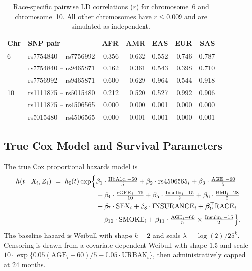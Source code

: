 \begin{table}[ht]
\centering
\caption{Race-specific pairwise LD correlations ($r$) for chromosome~6 and chromosome~10. All other chromosomes have $r \leq 0.009$ and are simulated as independent.}
\label{tab:app_snp_ld}
\small
\begin{tabular}{llrrrrr}
\hline
\textbf{Chr} & \textbf{SNP pair} & \textbf{AFR} & \textbf{AMR} &
\textbf{EAS} & \textbf{EUR} & \textbf{SAS} \\
\hline
6 & rs7754840 -- rs7756992 & 0.356 & 0.632 & 0.552 & 0.746 & 0.787 \\
  & rs7754840 -- rs9465871 & 0.162 & 0.361 & 0.543 & 0.398 & 0.710 \\
  & rs7756992 -- rs9465871 & 0.600 & 0.629 & 0.964 & 0.544 & 0.918 \\
\hline
10 & rs1111875 -- rs5015480 & 0.212 & 0.520 & 0.527 & 0.992 & 0.906 \\
   & rs1111875 -- rs4506565 & 0.000 & 0.000 & 0.001 & 0.000 & 0.000 \\
   & rs5015480 -- rs4506565 & 0.000 & 0.001 & 0.001 & 0.000 & 0.001 \\
\hline
\end{tabular}
\end{table}

\subsection{True Cox Model and Survival Parameters}
\label{app:sim2_cox}

The true Cox proportional hazards model is
\begin{align}
    h(t \mid X_i, Z_i) \;=\; h_0(t) \exp\Bigl\{
    &\beta_1 \cdot \tfrac{\mathrm{HbA1c}_i - 50}{5}
    + \beta_2 \cdot \mathrm{rs4506565}_i
    + \beta_3 \cdot \tfrac{\mathrm{AGE}_i - 60}{5}
    \nonumber \\
    &+ \beta_4 \cdot \tfrac{\mathrm{eGFR}_i - 75}{10}
    + \beta_5 \cdot \tfrac{\mathrm{Insulin}_i - 15}{2}
    + \beta_6 \cdot \tfrac{\mathrm{BMI}_i - 28}{2}
    \nonumber \\
    &+ \beta_7 \cdot \mathrm{SEX}_i
    + \beta_8 \cdot \mathrm{INSURANCE}_i
    + \boldsymbol{\beta}_9^{\top} \mathrm{RACE}_i
    \nonumber \\
    &+ \beta_{10} \cdot \mathrm{SMOKE}_i
    + \beta_{11} \cdot \tfrac{\mathrm{AGE}_i - 60}{5}
      \times \tfrac{\mathrm{Insulin}_i - 15}{2}
    \Bigr\}.
    \label{eq:appb_cox_true}
\end{align}
The baseline hazard is Weibull with shape $k = 2$ and scale $\lambda = \log(2)/25^k$. Censoring is drawn from a covariate-dependent Weibull with shape $1.5$ and scale $10 \cdot \exp\{0.05(\mathrm{AGE}_i - 60)/5 - 0.05 \cdot \mathrm{URBAN}_i\}$, then administratively capped at 24 months.

